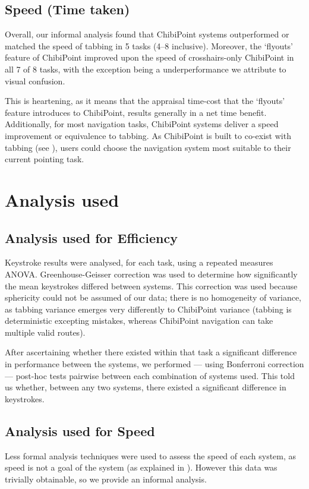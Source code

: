 \documentclass[a4paper, 12pt]{report}
\begin{document}
\subsection{Speed (Time taken)}
Overall, our informal analysis found that ChibiPoint systems outperformed or matched the speed of tabbing in 5 tasks (4--8 inclusive). Moreover, the `flyouts' feature of ChibiPoint improved upon the speed of crosshairs-only ChibiPoint in all 7 of 8 tasks, with the exception being a underperformance we attribute to visual confusion.

This is heartening, as it means that the appraisal time-cost that the `flyouts' feature introduces to ChibiPoint, results generally in a net time benefit. Additionally, for most navigation tasks, ChibiPoint systems deliver a speed improvement or equivalence to tabbing. As ChibiPoint is built to co-exist with tabbing (see ), users could choose the navigation system most suitable to their current pointing task.

\section{Analysis used}
\subsection{Analysis used for Efficiency}
Keystroke results were analysed, for each task, using a repeated measures ANOVA. Greenhouse-Geisser correction was used to determine how significantly the mean keystrokes differed between systems. This correction was used because sphericity could not be assumed of our data; there is no homogeneity of variance, as tabbing variance emerges very differently to ChibiPoint variance (tabbing is deterministic excepting mistakes, whereas ChibiPoint navigation can take multiple valid routes).

After ascertaining whether there existed within that task a significant difference in performance between the systems, we performed --- using Bonferroni correction --- post-hoc tests pairwise between each combination of systems used. This told us whether, between any two systems, there existed a significant difference in keystrokes.

\subsection{Analysis used for Speed}
Less formal analysis techniques were used to assess the speed of each system, as speed is not a goal of the system (as explained in ). However this data was trivially obtainable, so we provide an informal analysis.
\end{document}
